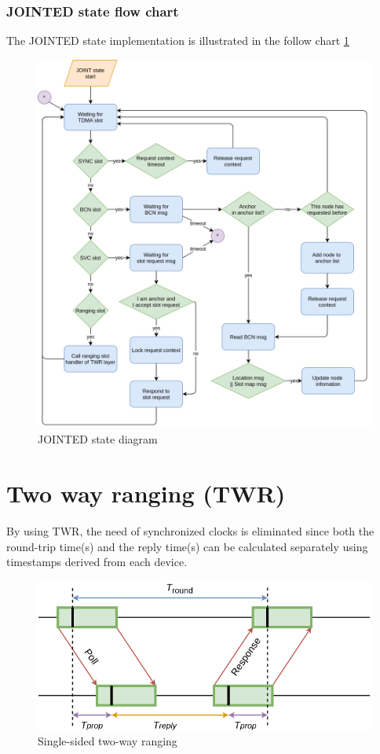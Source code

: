 \documentclass[../../main.tex]{subfiles}
\begin{document}
\subsubsection{JOINTED state flow chart}
The JOINTED state implementation is illustrated in the follow chart \ref{fig:JOINTED_state_diagram}
\begin{figure}[H]
    \begin{center}
        \includegraphics[scale=0.32]{JOINTED_state_flow_chart.png}
    \end{center}
    \caption{JOINTED state diagram}
    \label{fig:JOINTED_state_diagram}
\end{figure}

\section{Two way ranging (TWR)}
By using TWR, the need of synchronized clocks is eliminated since both the round-trip time(s) and the reply time(s) can be calculated separately using timestamps derived from each device.
\begin{figure}[H]
    \begin{center}
        \includegraphics[scale=0.32]{single_sided_two_way_ranging.png}
    \end{center}
    \caption{Single-sided two-way ranging}
    \label{fig:single_sided_two_way_ranging}
\end{figure}
\end{document}

